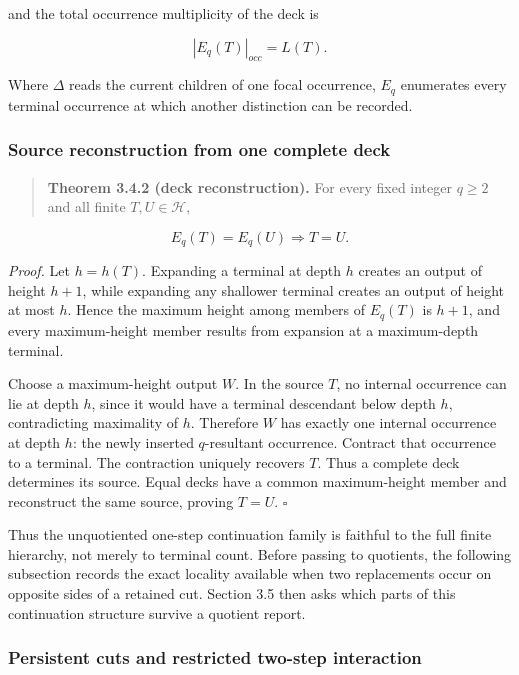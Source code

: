 \documentclass[11pt,a4paper]{article}
\begin{document}
and the total occurrence multiplicity of the deck is

\[\left| E_{q}(T) \right|_{occ} = L(T).\]

Where \(\Delta\) reads the current children of one focal occurrence,
\(E_{q}\) enumerates every terminal occurrence at which another
distinction can be recorded.

\subsubsection{Source reconstruction from one complete
deck}

\begin{quote}
\textbf{Theorem 3.4.2 (deck reconstruction).} For every fixed integer
\(q \geq 2\) and all finite \(T,U \in \mathcal{H}\),
\end{quote}

\[\boxed{E_{q}(T) = E_{q}(U) \Rightarrow T = U.}\]

\emph{Proof.} Let \(h = h(T)\). Expanding a terminal at depth \(h\)
creates an output of height \(h + 1\), while expanding any shallower
terminal creates an output of height at most \(h\). Hence the maximum
height among members of \(E_{q}(T)\) is \(h + 1\), and every
maximum-height member results from expansion at a maximum-depth
terminal.

Choose a maximum-height output \(W\). In the source \(T\), no internal
occurrence can lie at depth \(h\), since it would have a terminal
descendant below depth \(h\), contradicting maximality of \(h\).
Therefore \(W\) has exactly one internal occurrence at depth \(h\): the
newly inserted \(q\)-resultant occurrence. Contract that occurrence to a
terminal. The contraction uniquely recovers \(T\). Thus a complete deck
determines its source. Equal decks have a common maximum-height member
and reconstruct the same source, proving \(T = U\). \(\ensuremath{\square}\)

Thus the unquotiented one-step continuation family is faithful to the
full finite hierarchy, not merely to terminal count. Before passing to
quotients, the following subsection records the exact locality available
when two replacements occur on opposite sides of a retained cut. Section
3.5 then asks which parts of this continuation structure survive a
quotient report.

\subsubsection{Persistent cuts and restricted two-step
interaction}
\end{document}
